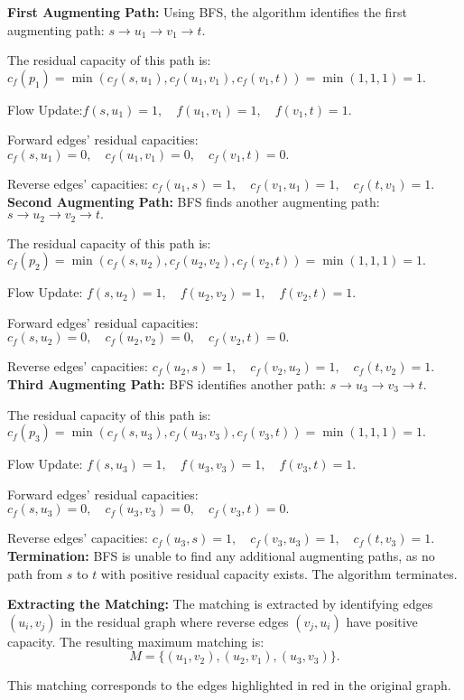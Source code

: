 \textbf{First Augmenting Path:} Using BFS, the algorithm identifies the first augmenting path:
$s \to u_1 \to v_1 \to t$.
\par The residual capacity of this path is: $c_f(p_1) = \min(c_f(s, u_1), c_f(u_1, v_1), c_f(v_1, t)) = \min(1, 1, 1) = 1.$
\par Flow Update:$f(s, u_1) = 1, \quad f(u_1, v_1) = 1, \quad f(v_1, t) = 1$.
\par Forward edges' residual capacities: $c_f(s, u_1) = 0, \quad c_f(u_1, v_1) = 0, \quad c_f(v_1, t) = 0.$
\par Reverse edges' capacities: $c_f(u_1, s) = 1, \quad c_f(v_1, u_1) = 1, \quad c_f(t, v_1) = 1.$\\

\textbf{Second Augmenting Path:} BFS finds another augmenting path: $s \to u_2 \to v_2 \to t.$
\par The residual capacity of this path is: $c_f(p_2) = \min(c_f(s, u_2), c_f(u_2, v_2), c_f(v_2, t)) = \min(1, 1, 1) = 1.$
\par Flow Update: $f(s, u_2) = 1, \quad f(u_2, v_2) = 1, \quad f(v_2, t) = 1.$
\par Forward edges' residual capacities: $c_f(s, u_2) = 0, \quad c_f(u_2, v_2) = 0, \quad c_f(v_2, t) = 0.$
\par Reverse edges' capacities: $c_f(u_2, s) = 1, \quad c_f(v_2, u_2) = 1, \quad c_f(t, v_2) = 1.$\\

\textbf{Third Augmenting Path:} BFS identifies another path: $s \to u_3 \to v_3 \to t.$
\par The residual capacity of this path is: $c_f(p_3) = \min(c_f(s, u_3), c_f(u_3, v_3), c_f(v_3, t)) = \min(1, 1, 1) = 1.$
\par Flow Update: $f(s, u_3) = 1, \quad f(u_3, v_3) = 1, \quad f(v_3, t) = 1.$
\par Forward edges' residual capacities: $c_f(s, u_3) = 0, \quad c_f(u_3, v_3) = 0, \quad c_f(v_3, t) = 0.$
\par Reverse edges' capacities: $c_f(u_3, s) = 1, \quad c_f(v_3, u_3) = 1, \quad c_f(t, v_3) = 1.$\\

\textbf{Termination:} BFS is unable to find any additional augmenting paths, as no path from $s$ to $t$ with positive residual capacity exists. The algorithm terminates.

\textbf{Extracting the Matching:} The matching is extracted by identifying edges $(u_i, v_j)$ in the residual graph where reverse edges \( (v_j, u_i) \) have positive capacity. The resulting maximum matching is:
\[
M = \{ (u_1, v_2), (u_2, v_1), (u_3, v_3) \}.
\]
\par This matching corresponds to the edges highlighted in red in the original graph.


